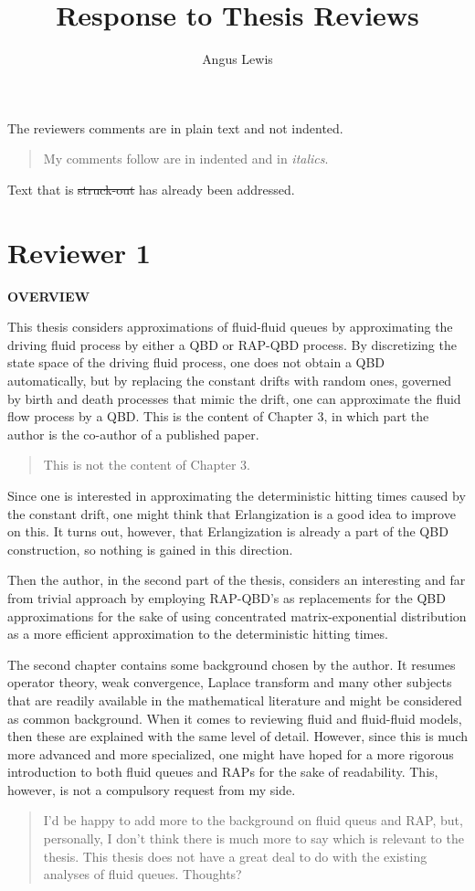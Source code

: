 \documentclass[a4paper]{article}
\title{Response to Thesis Reviews}
\author{Angus Lewis}
\begin{document}
\maketitle
The reviewers comments are in plain text and not indented. 
\begin{quote}
    My comments follow are in indented and in \emph{italics}. 
\end{quote}
Text that is \st{struck-out} has already been addressed.

\pagebreak
\section{Reviewer 1}

\noindent\textbf{OVERVIEW} 

This thesis considers approximations of fluid-fluid queues by approximating the driving fluid process by either a QBD or RAP-QBD process. By discretizing the state space of the driving fluid process, one does not obtain a QBD automatically, but by
replacing the constant drifts with random ones, governed by birth and death processes that mimic the drift, one can approximate the fluid flow process by a QBD.
This is the content of Chapter 3, in which part the author is the co-author of a
published paper.
\begin{quote}
    This is not the content of Chapter 3. 
\end{quote}

Since one is interested in approximating the deterministic hitting times caused by
the constant drift, one might think that Erlangization is a good idea to improve on
this. It turns out, however, that Erlangization is already a part of the QBD construction, so nothing is gained in this direction.

Then the author, in the second part of the thesis, considers an interesting and far
from trivial approach by employing RAP-QBD's as replacements for the QBD approximations for the sake of using concentrated matrix-exponential distribution as a
more efficient approximation to the deterministic hitting times.

The second chapter contains some background chosen by the author. It resumes operator theory, weak convergence, Laplace transform and many other subjects that are
readily available in the mathematical literature and might be considered as common
background. When it comes to reviewing fluid and fluid-fluid models, then these are
explained with the same level of detail. However, since this is much more advanced
and more specialized, one might have hoped for a more rigorous introduction to both
fluid queues and RAPs for the sake of readability. This, however, is not a compulsory
request from my side.
\begin{quote}
    I'd be happy to add more to the background on fluid queus and RAP, but, personally, I don't think there is much more to say which is relevant to the thesis. This thesis does not have a great deal to do with the existing analyses of fluid queues. Thoughts?
\end{quote}
\end{document}
